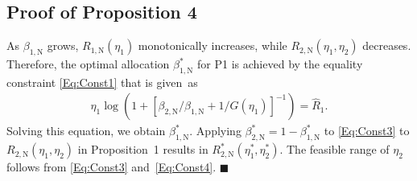 \documentclass[conference]{IEEEtran}
\def\R{{\hat{R}_1}}
\def\NOMA{\text{N}}
\begin{document}
\subsection{ Proof of Proposition 4}
As $\beta_{1,\NOMA}$ grows, $R_{1,\NOMA}(\eta_1)$ monotonically increases, while $R_{2,\NOMA}(\eta_1,\eta_2)$ decreases. Therefore, the optimal allocation $\beta_{1,\NOMA}^*$ for \textsf{P1} is achieved by the equality constraint \eqref{Eq:Const1} that is given~as
\vspace{-10pt}\small\begin{align}
\eta_1 \log(1 + [\beta_{2,\NOMA}/\beta_{1,\NOMA} + 1/G(\eta_1)]^{-1}) = \R.
\end{align}\normalsize
Solving this equation, we obtain $\beta_{1,\NOMA}^*$. Applying $\beta_{2,\NOMA}^*=1-\beta_{1,\NOMA}^*$ to \eqref{Eq:Const3} to $R_{2,\NOMA}(\eta_1,\eta_2)$ in Proposition~1 results in $R_{2,\NOMA}^*(\eta_1^*,\eta_2^*)$. The feasible range of $\eta_2$ follows from \eqref{Eq:Const3} and~\eqref{Eq:Const4}. \hfill$\blacksquare$
\end{document}
